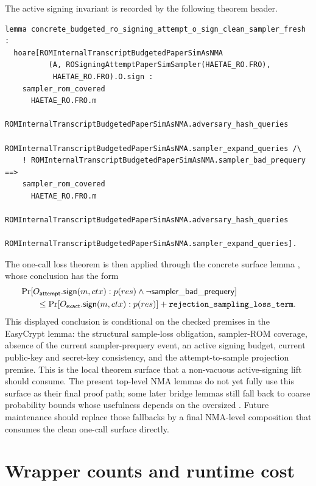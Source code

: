 The active signing invariant is recorded by the following theorem header.

\begin{lstlisting}[language=EasyCrypt,caption={Sampler-ROM coverage preservation for one active signing call.},label={lst:o-sign-clean-sampler-fresh}]
lemma concrete_budgeted_ro_signing_attempt_o_sign_clean_sampler_fresh :
  hoare[ROMInternalTranscriptBudgetedPaperSimAsNMA
          (A, ROSigningAttemptPaperSimSampler(HAETAE_RO.FRO),
           HAETAE_RO.FRO).O.sign :
    sampler_rom_covered
      HAETAE_RO.FRO.m
      ROMInternalTranscriptBudgetedPaperSimAsNMA.adversary_hash_queries
      ROMInternalTranscriptBudgetedPaperSimAsNMA.sampler_expand_queries /\
    ! ROMInternalTranscriptBudgetedPaperSimAsNMA.sampler_bad_prequery ==>
    sampler_rom_covered
      HAETAE_RO.FRO.m
      ROMInternalTranscriptBudgetedPaperSimAsNMA.adversary_hash_queries
      ROMInternalTranscriptBudgetedPaperSimAsNMA.sampler_expand_queries].
\end{lstlisting}

The one-call loss theorem is then applied through the concrete surface lemma
,
whose conclusion has the form
\[
\begin{aligned}
&\Pr[O_{\mathsf{attempt}}.\mathsf{sign}(m,ctx):
      p(res)\wedge\neg\mathsf{sampler\_bad\_prequery}] \\
&\qquad\le
  \Pr[O_{\mathsf{exact}}.\mathsf{sign}(m,ctx):p(res)]
  + \texttt{rejection\_sampling\_loss\_term}.
\end{aligned}
\]
This displayed conclusion is conditional on the checked premises in the EasyCrypt
lemma: the structural sample-loss obligation, sampler-ROM coverage, absence of
the current sampler-prequery event, an active signing budget, current public-key
and secret-key consistency, and the attempt-to-sample projection premise.
This is the local theorem surface that a non-vacuous active-signing lift should
consume.  The present top-level NMA lemmas do not yet fully use this surface as
their final proof path; some later bridge lemmas still fall back to coarse
probability bounds whose usefulness depends on the oversized
.  Future maintenance should replace those
fallbacks by a final NMA-level composition that consumes the clean one-call
surface directly.

\section{Wrapper counts and runtime cost}
\label{sec:synthesis-budget-runtime-final}

